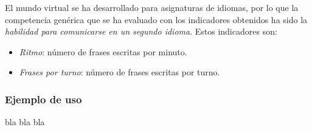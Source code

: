 El mundo virtual se ha desarrollado para asignaturas de idiomas, por lo que la competencia genérica que se ha evaluado con los indicadores obtenidos ha sido la \emph{habilidad para comunicarse en un segundo idioma}. Estos indicadores son:


\begin{itemize}
\item \emph{Ritmo}: número de frases escritas por minuto.
\item \emph{Frases por turno}: número de frases escritas por turno.
\end{itemize}

\subsubsection{Ejemplo de uso}

bla bla bla






 











